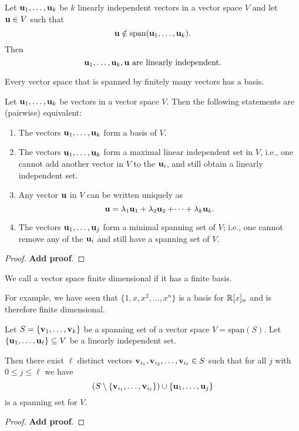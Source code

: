 \documentclass[10pt, a4paper]{article}
\begin{document}
\begin{lemma}\label{pre_linalg_lem_ifnotinspanofvecspacethenlinindep}
    Let $\mathbf{u}_1, \dotsc, \mathbf{u}_k$ be $k$ linearly independent vectors in a vector space $V$ and let $\mathbf{u} \in V$ such that
    \[
    \mathbf{u} \notin \mathrm{span}(\mathbf{u}_1, \dotsc, \mathbf{u}_k).
    \]
    Then
    \[
    \mathbf{u}_1, \dotsc, \mathbf{u}_k, \mathbf{u}\text{ are linearly independent}.
    \]
\end{lemma}

\begin{theorem}
    Every vector space that is spanned by finitely many vectors has a basis.
\end{theorem}

\begin{theorem}\label{pre_linalg_thm_whatisabasis}
    Let $\mathbf{u}_1, \dotsc, \mathbf{u}_k$ be vectors in a vector space $V$.
    Then the following statements are
    (pairwise)
    equivalent:
    \begin{enumerate}[label = (\roman*)]
        \item The vectors $\mathbf{u}_1, \dotsc, \mathbf{u}_k$ form a basis of $V$.
        \item The vectors $\mathbf{u}_1, \dotsc, \mathbf{u}_k$ form a maximal linear independent set in $V$,
        i.e., one cannot add another vector in $V$ to the $\mathbf{u}_i$,
        and still obtain a linearly independent set.
        \item Any vector $\mathbf{u}$ in $V$ can be written uniquely as
        \[
        \mathbf{u} = \lambda_1\mathbf{u}_1 + \lambda_2\mathbf{u}_2 + \dotsi + \lambda_k\mathbf{u}_k.
        \]
        \item The vectors $\mathbf{u}_1, \dotsc, \mathbf{u}_j$ form a minimal spanning set of $V$;
        i.e., one cannot remove any of the $\mathbf{u}_i$ and still have a spanning set of $V$.
    \end{enumerate}
    \begin{proof}
        \textbf{Add proof}.
    \end{proof}
\end{theorem}

We call a vector space finite dimensional if it has a finite basis.

For example,
we have seen that $\{1, x, x ^ 2, \dotsc, x ^ n\}$ is a basis for $\mathbb{R}[x]_n$ and is therefore finite dimensional.

\begin{theorem}
    Let $S = \{\mathbf{v}_1, \dotsc, \mathbf{v}_k\}$ be a spanning set of a vector space $V = \mathrm{span}(S)$.
    Let $\{\mathbf{u}_1, \dotsc, \mathbf{u}_{\ell}\} \subseteq V$ be a linearly independent set.

    Then there exist $\ell$ distinct vectors $\mathbf{v}_{i_1}, \mathbf{v}_{i_2}, \dotsc, \mathbf{v}_{i_{\ell}} \in S$ such that for all $j$ with $0 \leq j \leq \ell$ we have
    \[
    (S \setminus \{\mathbf{v}_{i_1}, \dotsc, \mathbf{v}_{i_{\ell}}\}) \cup \{\mathbf{u}_1, \dotsc, \mathbf{u}_j\}
    \]
    is a spanning set for $V$.
    \begin{proof}
        \textbf{Add proof}.
    \end{proof}
\end{theorem}
\end{document}
